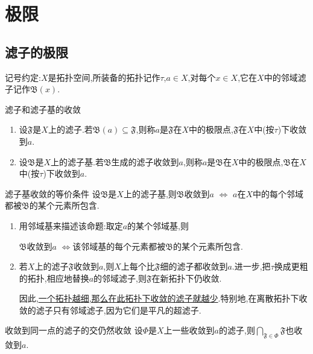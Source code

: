 \chapter{极限}

\section{滤子的极限}

记号约定:$X$是拓扑空间,所装备的拓扑记作$\tau$,$a\in X$,对每个$x\in X$,它在$X$中的邻域滤子记作$\mathfrak{B}\left(x\right)$.

\begin{definition}{滤子和滤子基的收敛}{}
	\begin{enumerate}
		\item 设$\mathfrak{F}$是$X$上的滤子.若$\mathfrak{B}\left(a\right)\subseteq\mathfrak{F}$,则称$a$是$\mathfrak{F}$在$X$中的极限点,$\mathfrak{F}$在$X$中(按$\tau$)下收敛到$a$.
		\item 设$\mathfrak{B}$是$X$上的滤子基.若$\mathfrak{B}$生成的滤子收敛到$a$,则称$a$是$\mathfrak{B}$在$X$中的极限点,$\mathfrak{B}$在$X$中(按$\tau$)下收敛到$a$.
	\end{enumerate}
\end{definition}

\begin{proposition}{滤子基收敛的等价条件}{}
	设$\mathfrak{B}$是$X$上的滤子基,则$\mathfrak{B}$收敛到$a$ $\iff$ $a$在$X$中的每个邻域都被$\mathfrak{B}$的某个元素所包含.
\end{proposition}

\begin{remark}{}{}
	\begin{enumerate}
		\item 用邻域基来描述该命题:取定$a$的某个邻域基,则
		\begin{center}
			$\mathfrak{B}$收敛到$a$ $\iff$该邻域基的每个元素都被$\mathfrak{B}$的某个元素所包含.
		\end{center}
		\item 若$X$上的滤子$\mathfrak{F}$收敛到$a$,则$X$上每个比$\mathfrak{F}$细的滤子都收敛到$a$.进一步,把$\tau$换成更粗的拓扑,相应地替换$a$的邻域滤子,则$\mathfrak{F}$在新拓扑下仍收敛.
		
		因此,\underline{一个拓扑越细,那么在此拓扑下收敛的滤子就越少}.特别地,在离散拓扑下收敛的滤子只有邻域滤子,因为它们是平凡的超滤子.
	\end{enumerate}
\end{remark}

\begin{proposition}{收敛到同一点的滤子的交仍然收敛}{}
	设$\Phi$是$X$上一些收敛到$a$的滤子,则$\bigcap\limits_{\mathfrak{F}\in\Phi}\mathfrak{F}$也收敛到$a$.
\end{proposition}

